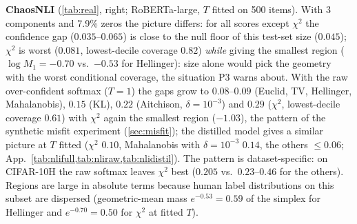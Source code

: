 \textbf{ChaosNLI} (\cref{tab:real}, right; RoBERTa-large, $T$ fitted on 500 items). With 3 components and 7.9\% zeros the picture differs: for all scores except $\chi^2$ the confidence gap ($0.035$--$0.065$) is close to the null floor of this test-set size ($0.045$); $\chi^2$ is worst ($0.081$, lowest-decile coverage $0.82$) \emph{while} giving the smallest region ($\log M_1=-0.70$ vs.\ $-0.53$ for Hellinger): size alone would pick the geometry with the worst conditional coverage, the situation P3 warns about. With the raw over-confident softmax ($T=1$) the gaps grow to $0.08$--$0.09$ (Euclid, TV, Hellinger, Mahalanobis), $0.15$ (KL), $0.22$ (Aitchison, $\delta=10^{-3}$) and $0.29$ ($\chi^2$, lowest-decile coverage $0.61$) with $\chi^2$ again the smallest region ($-1.03$), the pattern of the synthetic misfit experiment (\cref{sec:misfit}); the distilled model gives a similar picture at $T$ fitted ($\chi^2$ $0.10$, Mahalanobis with $\delta=10^{-3}$ $0.14$, the others $\le0.06$; App.\ \cref{tab:nlifull,tab:nliraw,tab:nlidistil}). The pattern is dataset-specific: on CIFAR-10H the raw softmax leaves $\chi^2$ best ($0.205$ vs.\ $0.23$--$0.46$ for the others). Regions are large in absolute terms because human label distributions on this subset are dispersed (geometric-mean mass $e^{-0.53}=0.59$ of the simplex for Hellinger and $e^{-0.70}=0.50$ for $\chi^2$ at fitted $T$).
